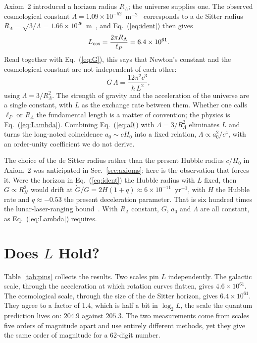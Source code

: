 \documentclass[aps,prd,twocolumn,superscriptaddress,nofootinbib,showkeys]{revtex4-2}
\begin{document}
Axiom~2 introduced a horizon radius $R_\Lambda$; the universe supplies one. The observed cosmological constant $\Lambda = 1.09\times10^{-52}$~m$^{-2}$~\cite{planck2018} corresponds to a de Sitter radius $R_\Lambda = \sqrt{3/\Lambda} = 1.66\times10^{26}$~m~\cite{gibbons1977}, and Eq.~(\ref{eq:ident}) then gives
\begin{equation}
L_{\rm cos} = \frac{2\pi R_\Lambda}{\ell_P} = 6.4\times10^{61}.
\label{eq:Lcos}
\end{equation}
Read together with Eq.~(\ref{eq:G}), this says that Newton's constant and the cosmological constant are not independent of each other:
\begin{equation}
G\,\Lambda = \frac{12\pi^2c^3}{\hbar\,L^2},
\label{eq:Lambda}
\end{equation}
using $\Lambda = 3/R_\Lambda^2$. The strength of gravity and the acceleration of the universe are a single constant, with $L$ as the exchange rate between them. Whether one calls $\ell_P$ or $R_\Lambda$ the fundamental length is a matter of convention; the physics is Eq.~(\ref{eq:Lambda}). Combining Eq.~(\ref{eq:a0}) with $\Lambda = 3/R_\Lambda^2$ eliminates $L$ and turns the long-noted coincidence $a_0\sim cH_0$ into a fixed relation, $\Lambda \propto a_0^2/c^4$, with an order-unity coefficient we do not derive.

The choice of the de Sitter radius rather than the present Hubble radius $c/H_0$ in Axiom~2 was anticipated in Sec.~\ref{sec:axioms}; here is the observation that forces it. Were the horizon in Eq.~(\ref{eq:ident}) the Hubble radius with $L$ fixed, then $G\propto R_H^2$ would drift at $\dot G/G = 2H(1+q)\approx6\times10^{-11}$~yr$^{-1}$, with $H$ the Hubble rate and $q\approx-0.53$ the present deceleration parameter. That is six hundred times the lunar-laser-ranging bound~\cite{hofmann2018}. With $R_\Lambda$ constant, $G$, $a_0$ and $\Lambda$ are all constant, as Eq.~(\ref{eq:Lambda}) requires.

\section{Does $L$ Hold?}
\label{sec:hold}

Table~\ref{tab:pins} collects the results. Two scales pin $L$ independently. The galactic scale, through the acceleration at which rotation curves flatten, gives $4.6\times10^{61}$. The cosmological scale, through the size of the de Sitter horizon, gives $6.4\times10^{61}$. They agree to a factor of $1.4$, which is half a bit in $\log_2 L$, the scale the quantum prediction lives on: $204.9$ against $205.3$. The two measurements come from scales five orders of magnitude apart and use entirely different methods, yet they give the same order of magnitude for a $62$-digit number.
\end{document}
